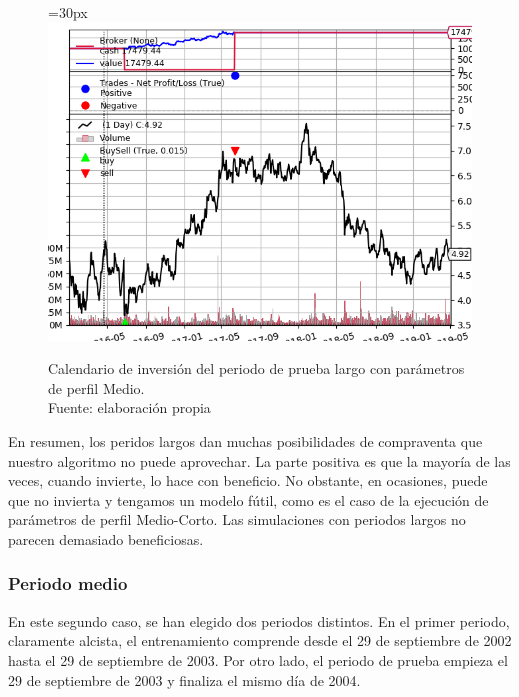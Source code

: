      	\begin{figure}[H]
     		\centering\leftskip=30px
     		\includegraphics[scale=0.75]{imagenes/L_Medium_test.png}
     		\caption[Calendario de inversi\'on del periodo de prueba largo]{Calendario de inversi\'on del periodo de prueba largo con par\'ametros de perfil Medio.\\ Fuente: elaboraci\'on propia}
     		\label{fig:large_period_mtest}
     	\end{figure}     	

En resumen, los peridos largos dan muchas posibilidades de compraventa que nuestro algoritmo no puede aprovechar. La parte positiva es que la mayor\'ia de las veces, cuando invierte, lo hace con beneficio. No obstante, en ocasiones, puede que no invierta y tengamos un modelo f\'util, como es el caso de la ejecuci\'on de par\'ametros de perfil Medio-Corto. Las simulaciones con periodos largos no parecen demasiado beneficiosas.\\

\subsubsection{Periodo medio}

En este segundo caso, se han elegido dos periodos distintos. En el primer periodo, claramente alcista, el entrenamiento comprende desde el 29 de septiembre de 2002 hasta el 29 de septiembre de 2003. Por otro lado, el periodo de prueba empieza el 29 de septiembre de 2003 y finaliza el mismo d\'ia de 2004. \\

